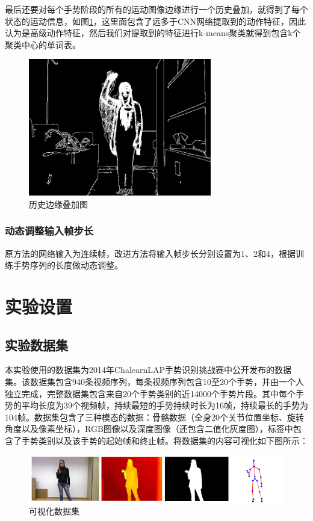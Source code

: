 \documentclass[a4paper, 12pt]{article}
\begin{document}
最后还要对每个手势阶段的所有的运动图像边缘进行一个历史叠加，就得到了每个状态的运动信息，如图\ref{fig:7}，这里面包含了远多于CNN网络提取到的动作特征，因此认为是高级动作特征，然后我们对提取到的特征进行k-means聚类就得到包含k个聚类中心的单词表。

\begin{figure}[ht]
  \centering
  \includegraphics[width=8cm]{combineresult.jpg}
  \caption{\label{fig:7}历史边缘叠加图}
\end{figure}

\subsubsection{动态调整输入帧步长}
原方法的网络输入为连续帧，改进方法将输入帧步长分别设置为1、2和4，根据训练手势序列的长度做动态调整。

\section{实验设置}
\subsection{实验数据集}
本实验使用的数据集为2014年ChalearnLAP手势识别挑战赛中公开发布的数据集。该数据集包含940条视频序列，每条视频序列包含10至20个手势，并由一个人独立完成，完整数据集包含来自20个手势类别的近14000个手势片段。其中每个手势的平均长度为39个视频帧，持续最短的手势持续时长为16帧，持续最长的手势为104帧。数据集包含了三种模态的数据：骨骼数据（全身20个关节位置坐标、旋转角度以及像素坐标），RGB图像以及深度图像（还包含二值化灰度图），标签中包含了手势类别以及该手势的起始帧和终止帧。将数据集的内容可视化如下图所示：

\begin{figure}[ht]
  \centering
  \includegraphics[width=12cm]{dataVisual.png}
  \caption{\label{fig:8}可视化数据集}
\end{figure}
\end{document}
